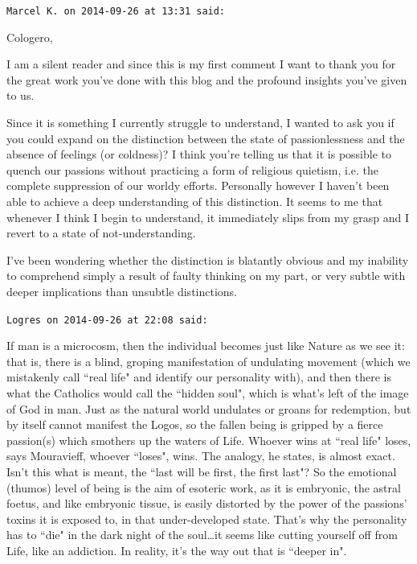 \begin{footnotesize}\begin{sffamily}



\texttt{Marcel K. on 2014-09-26 at 13:31 said: }

Cologero,

I am a silent reader and since this is my first comment I want to thank you for the great work you've done with this blog and the profound insights you've given to us.

Since it is something I currently struggle to understand, I wanted to ask you if you could expand on the distinction between the state of passionlessness and the absence of feelings (or coldness)? I think you're telling us that it is possible to quench our passions without practicing a form of religious quietism, i.e. the complete suppression of our worldy efforts. Personally however I haven't been able to achieve a deep understanding of this distinction. It seems to me that whenever I think I begin to understand, it immediately slips from my grasp and I revert to a state of not-understanding. 

I've been wondering whether the distinction is blatantly obvious and my inability to comprehend simply a result of faulty thinking on my part, or very subtle with deeper implications than unsubtle distinctions.


\hfill

\texttt{Logres on 2014-09-26 at 22:08 said: }

If man is a microcosm, then the individual becomes just like Nature as we see it: that is, there is a blind, groping manifestation of undulating movement (which we mistakenly call ``real life" and identify our personality with), and then there is what the Catholics would call the ``hidden soul", which is what's left of the image of God in man. Just as the natural world undulates or groans for redemption, but by itself cannot manifest the Logos, so the fallen being is gripped by a fierce passion(s) which smothers up the waters of Life. Whoever wins at ``real life" loses, says Mouravieff, whoever ``loses", wins. The analogy, he states, is almost exact. Isn't this what is meant, the ``last will be first, the first last"? So the emotional (thumos) level of being is the aim of esoteric work, as it is embryonic, the astral foetus, and like embryonic tissue, is easily distorted by the power of the passions' toxins it is exposed to, in that under-developed state. That's why the personality has to ``die" in the dark night of the soul…it seems like cutting yourself off from Life, like an addiction. In reality, it's the way out that is ``deeper in".



\end{sffamily}
\end{footnotesize}
